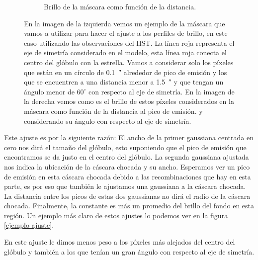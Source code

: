 \documentclass{book}
\begin{document}
\begin{figure}[htb]
\begin{subfigure}[b]{0.5\textwidth}
    \caption{Brillo de la máscara como función de la distancia.}
    \label{fig:f2}
  \end{subfigure}
  \caption{ En la imagen de la izquierda vemos un ejemplo de la máscara que vamos a utilizar para hacer el ajuste a los perfiles de brillo, en este caso utilizando las observaciones del HST. La línea roja representa el eje de simetría considerado en el modelo, esta línea roja conecta el centro del glóbulo con la estrella. Vamos a considerar solo los píxeles que están en un círculo de \SI{0.1}{\arcsecond} alrededor de pico de emisión y los que se encuentren a una distancia menor a \SI{1.5}{\arcsecond} y que tengan un ángulo menor de $60^\circ$ con respecto al eje de simetría. En la imagen de la derecha vemos como es el brillo de estos píxeles considerados en la máscara como función de la distancia al pico de emisión. y considerando su ángulo con respecto al eje de simetría.}
  \label{ejemplo mascara}
\end{figure}

Este ajuste es por la siguiente razón: El ancho de la primer gaussiana centrada en cero nos dirá el tamaño del glóbulo, esto suponiendo que el pico de emisión que encontramos se da justo en el centro del glóbulo. La segunda gaussiana ajustada nos indica la ubicación de la cáscara chocada y su ancho. Esperamos ver un pico de emisión en esta cáscara chocada debido a las recombinaciones que hay en esta parte, es por eso que también le ajustamos una gaussiana a la cáscara chocada. La distancia entre los picos de estas dos gaussianas no dirá el radio de la cáscara chocada. Finalmente, la constante es más un promedio del brillo del fondo en esta región. Un ejemplo más claro de estos ajustes lo podemos ver en la figura \ref{ejemplo ajuste}.

En este ajuste le dimos menos peso a los píxeles más alejados del centro del glóbulo y también a los que tenían un gran ángulo con respecto al eje de simetría.
\end{document}
